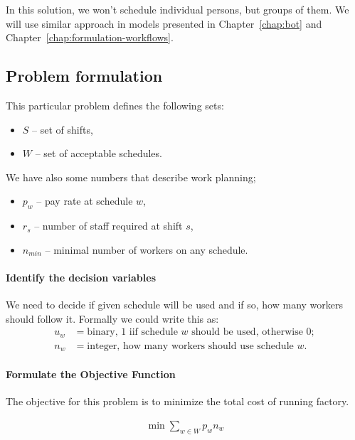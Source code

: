 In this solution, we won't schedule individual persons, but groups of them. We will use similar approach in models presented in Chapter~\ref{chap:bot} and Chapter~\ref{chap:formulation-workflows}.
 
\subsection{Problem formulation}

This particular problem defines the following sets: 

\begin{itemize}
  \item $S$ -- set of shifts,  
  \item $W$ -- set of acceptable schedules.
\end{itemize}

We have also some numbers that describe work planning;
\begin{itemize}
  \item $p_w$ -- pay rate at schedule $w$,
  \item $r_s$ -- number of staff required at shift $s$,
  \item $n_{min}$ -- minimal number of workers on any schedule.
\end{itemize}

\paragraph{Identify the decision variables}

We need to decide if given schedule will be used and if so, how many workers should follow it. Formally we could write this as:
\begin{align} 
  u_w &= \text{binary, 1 iif schedule $w$ should be used, otherwise 0}; \\
  n_w &= \text{integer, how many workers should use schedule $w$}.
\end{align} 

\paragraph{Formulate the Objective Function}

The objective for this problem is to minimize the total cost of running factory.

\begin{align}
   \min \mathop\sum\limits_{w \in W} p_w n_w
\end{align}


